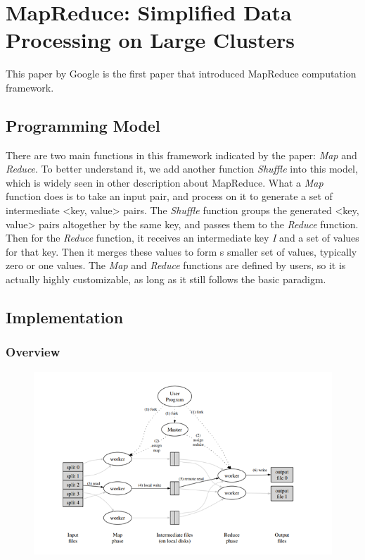 \documentclass[]{report}
\begin{document}
\section*{MapReduce: Simplified Data Processing on Large Clusters}
	This paper by Google is the first paper that introduced MapReduce computation framework.
	
	\subsection*{Programming Model}
		There are two main functions in this framework indicated by the paper: \textit{Map} and \textit{Reduce}. To better understand it, we add another function \textit{Shuffle} into this model, which is widely seen in other description about MapReduce.
		What a \textit{Map} function does is to take an input pair, and process on it to generate a set of intermediate <key, value> pairs.
		The \textit{Shuffle} function groups the generated <key, value> pairs altogether by the same key, and passes them to the \textit{Reduce} function.
		Then for the \textit{Reduce} function, it receives an intermediate key \textit{I} and a set of values for that key. Then it merges these values to form s smaller set of values, typically zero or one values.
		The \textit{Map} and \textit{Reduce} functions are defined by users, so it is actually highly customizable, as long as it still follows the basic paradigm.
	
	
	\subsection*{Implementation}		
		\subsubsection*{Overview}
			\begin{figure}[h]
				\centering
				\includegraphics[scale=0.8]{MapReduce.png}
			\end{figure}
\end{document}
